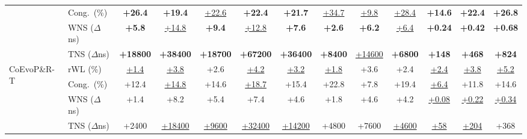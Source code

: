 \begin{table}[!htbp]
{\begin{tabular}{llccccccccccc}
  & Cong.\ (\%)      & \cellcolor{rankfirst}\textbf{+26.4} & \cellcolor{rankfirst}\textbf{+19.4} & \cellcolor{ranksecond}\underline{+22.6} & \cellcolor{rankfirst}\textbf{+22.4} & \cellcolor{rankfirst}\textbf{+21.7} & \cellcolor{ranksecond}\underline{+34.7} & \cellcolor{ranksecond}\underline{+9.8} & \cellcolor{ranksecond}\underline{+28.4} & \cellcolor{rankfirst}\textbf{+14.6} & \cellcolor{rankfirst}\textbf{+22.4} & \cellcolor{rankfirst}\textbf{+26.8} \\
  & WNS ($\Delta$ns) & \cellcolor{rankfirst}\textbf{+5.8} & \cellcolor{ranksecond}\underline{+14.8} & \cellcolor{rankfirst}\textbf{+9.4} & \cellcolor{ranksecond}\underline{+12.8} & \cellcolor{rankfirst}\textbf{+7.6} & \cellcolor{rankfirst}\textbf{+2.6} & \cellcolor{rankfirst}\textbf{+6.2} & \cellcolor{ranksecond}\underline{+6.4} & \cellcolor{rankfirst}\textbf{+0.24} & \cellcolor{rankfirst}\textbf{+0.42} & \cellcolor{rankfirst}\textbf{+0.68} \\
  & TNS ($\Delta$ns) & \cellcolor{rankfirst}\textbf{+18800} & \cellcolor{rankfirst}\textbf{+38400} & \cellcolor{rankfirst}\textbf{+18700} & \cellcolor{rankfirst}\textbf{+67200} & \cellcolor{rankfirst}\textbf{+36400} & \cellcolor{rankfirst}\textbf{+8400} & \cellcolor{ranksecond}\underline{+14600} & \cellcolor{rankfirst}\textbf{+6800} & \cellcolor{rankfirst}\textbf{+148} & \cellcolor{rankfirst}\textbf{+468} & \cellcolor{rankfirst}\textbf{+824} \\
\midrule
\multirow{4}{*}{CoEvoP\&R-T}
  & rWL (\%)         & \cellcolor{ranksecond}\underline{+1.4} & \cellcolor{ranksecond}\underline{+3.8} & +2.6 & \cellcolor{ranksecond}\underline{+4.2} & \cellcolor{ranksecond}\underline{+3.2} & \cellcolor{ranksecond}\underline{+1.8} & +3.6 & +2.4 & \cellcolor{ranksecond}\underline{+2.4} & \cellcolor{ranksecond}\underline{+3.8} & \cellcolor{ranksecond}\underline{+5.2} \\
  & Cong.\ (\%)      & +12.4 & \cellcolor{ranksecond}\underline{+14.8} & +14.6 & \cellcolor{ranksecond}\underline{+18.7} & +15.4 & +22.8 & +7.8 & +19.4 & \cellcolor{ranksecond}\underline{+6.4} & +11.8 & +14.6 \\
  & WNS ($\Delta$ns) & +1.4 & +8.2 & +5.4 & +7.4 & +4.6 & +1.8 & +4.6 & +4.2 & \cellcolor{ranksecond}\underline{+0.08} & \cellcolor{ranksecond}\underline{+0.22} & \cellcolor{ranksecond}\underline{+0.34} \\
  & TNS ($\Delta$ns) & +2400 & \cellcolor{ranksecond}\underline{+18400} & \cellcolor{ranksecond}\underline{+9600} & \cellcolor{ranksecond}\underline{+32400} & \cellcolor{ranksecond}\underline{+14200} & +4800 & +7600 & \cellcolor{ranksecond}\underline{+4600} & \cellcolor{ranksecond}\underline{+58} & \cellcolor{ranksecond}\underline{+204} & +368 \\

\end{tabular}}
\end{table}
